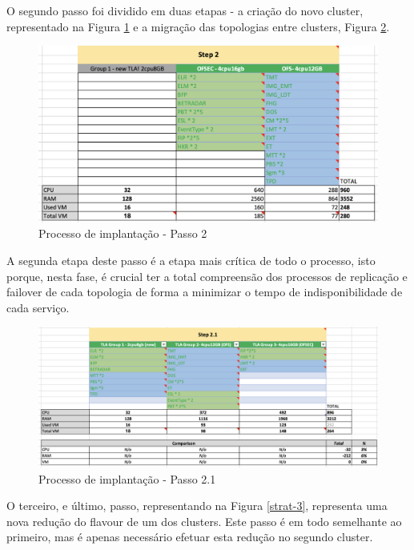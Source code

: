 O segundo passo foi dividido em duas etapas - a criação do novo \gls{cluster}, representado na 
Figura \ref{strat-2} e a migração das topologias entre \glspl{cluster}, Figura \ref{strat-2_1}.

\begin{figure}[H]
  \centerline{\includegraphics[scale=0.5]{media/content/analise/strat-2.png}}
  \caption{Processo de implantação - Passo 2}
  \label{strat-2}
\end{figure}

A segunda etapa deste passo é a etapa mais crítica de todo o processo, isto porque, nesta fase, é
crucial ter a total compreensão dos processos de replicação e \gls{failover} de cada topologia de
forma a minimizar o tempo de indisponibilidade de cada serviço.

\begin{figure}[H]
  \centerline{\includegraphics[scale=0.4]{media/content/analise/strat-2_1.png}}
  \caption{Processo de implantação - Passo 2.1}
  \label{strat-2_1}
\end{figure}

O terceiro, e último, passo, representando na Figura \ref{strat-3}, representa uma nova redução 
do \gls{flavour} de um dos \glspl{cluster}. Este passo é em todo semelhante ao primeiro, mas é
apenas necessário efetuar esta redução no segundo \gls{cluster}.

